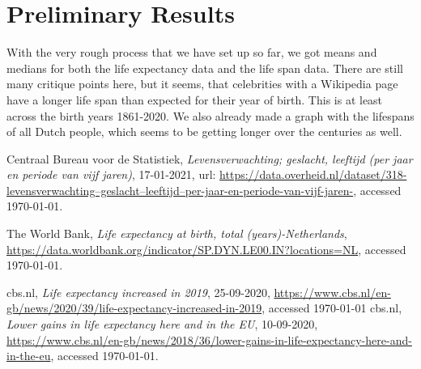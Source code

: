 \documentclass{article}
\begin{document}
\section{Preliminary Results}

With the very rough process that we have set up so far, we got means and medians for both the life expectancy data and the life span data. There are still many critique points here, but it seems, that celebrities with a Wikipedia page have a longer life span than expected for their year of birth. This is at least across the birth years 1861-2020. We also already made a graph with the lifespans of all Dutch people, which seems to be getting longer over the centuries as well.

\begin{thebibliography}	{}

 Centraal Bureau voor de Statistiek, \textit{Levensverwachting; geslacht, leeftijd (per jaar en periode van vijf jaren)}, 17-01-2021, url:
\href{https://data.overheid.nl/dataset/318-levensverwachting--geslacht--leeftijd--per-jaar-en-periode-van-vijf-jaren-}{https://data.overheid.nl/dataset/318-levensverwachting--geslacht--leeftijd--per-jaar-en-periode-van-vijf-jaren-}, accessed {\today}. 

 The World Bank, \textit{Life expectancy at birth, total (years)-Netherlands}, \href{https://data.worldbank.org/indicator/SP.DYN.LE00.IN?locations=NL}{https://data.worldbank.org/indicator/SP.DYN.LE00.IN?locations=NL}, accessed {\today}.

cbs.nl, \textit{Life expectancy increased in 2019}, 25-09-2020, \href{https://www.cbs.nl/en-gb/news/2020/39/life-expectancy-increased-in-2019}{https://www.cbs.nl/en-gb/news/2020/39/life-expectancy-increased-in-2019}, accessed {\today}
cbs.nl, \textit{Lower gains in life expectancy here and in the EU}, 10-09-2020, \href{https://www.cbs.nl/en-gb/news/2018/36/lower-gains-in-life-expectancy-here-and-in-the-eu}{https://www.cbs.nl/en-gb/news/2018/36/lower-gains-in-life-expectancy-here-and-in-the-eu}, accessed {\today}.


\end{thebibliography}
\end{document}
